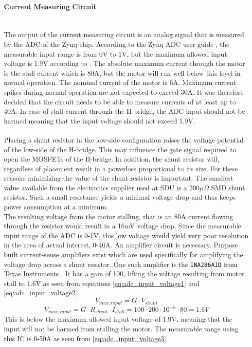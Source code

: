 \paragraph{Current Measuring Circuit} ~\\%
\label{par:requirements_for_the_current_measuring_circuit}
The output of the current measuring circuit is an analog signal that is measured by the ADC of the Zynq chip.
According to the Zynq ADC user guide \cite{zynq_adc}, the measurable input range is from 0V to 1V, but the maximum allowed input voltage is 1.9V according to \cite{adc_zynq_webanswer}.
The absolute maximum current through the motor is the stall current which is 80A, but the motor will run well below this level in normal operation.
The nominal current of the motor is 6A. 
Maximum current spikes during normal operation are not expected to exceed 30A. 
It was therefore decided that the circuit  needs to be able to measure currents of at least up to 40A.
In case of stall current through the H-bridge, the ADC input should not be harmed meaning that the input voltage should not exceed 1.9V.
\\~\\
Placing a shunt resistor in the low-side configuration raises the voltage potential of the low-side of the H-bridge.
This may influence the gate signal required to open the MOSFETs of the H-bridge.
In addition, the shunt resistor will, regardless of placement result in a powerloss proportional to its size.
For these reasons minimizing the value of the shunt resistor is important. 
The smallest value available from the electronics supplier used at SDU is a 200$\mu\Omega$ SMD shunt resistor.
Such a small resistance yields a minimal voltage drop and thus keeps power consumption at a minimum.\\
The resulting voltage from the motor stalling, that is an 80A current flowing through the resistor would result in a 16mV voltage drop.
Since the measurable input range of the ADC is 0-1V, this low voltage would yield very poor resolution in the area of actual interest, 0-40A.
An amplifier circuit is necessary.
Purpose built current-sense amplifiers exist which are used specifically for amplifying the voltage drop across a shunt resistor.
One such amplifier is the \texttt{INA286AID} from Texas Instruments \cite{INA286AID}.
It has a gain of 100, lifting the voltage resulting from motor stall to 1.6V as seen from equations \ref{eq:adc_input_voltage1} and \ref{eq:adc_input_voltage2}.
\begin{equation}
	V_{max,input} = G \cdot V_{shunt}
	\label{eq:adc_input_voltage1}
\end{equation}
\begin{equation}
	V_{max,input} = G \cdot R_{shunt} \cdot I_{stall} = 100 \cdot 200\cdot10^{-6} \cdot 80 = 1.6V
	\label{eq:adc_input_voltage2}
\end{equation}
This is below the maximum allowed input voltage of 1.9V, meaning that the input will not be harmed from stalling the motor.
The measurable range using this IC is 0-50A as seen from \ref{eq:adc_input_voltage3}.

